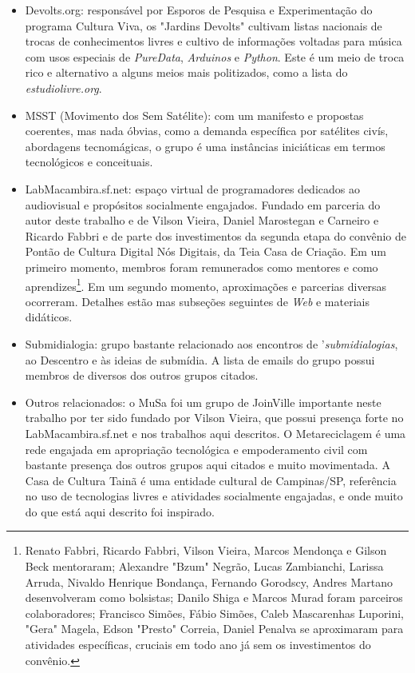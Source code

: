 \begin{itemize}
    \item Devolts.org: responsável por Esporos de Pesquisa e Experimentação do programa Cultura Viva, os "Jardins Devolts" cultivam listas nacionais de trocas de conhecimentos livres e cultivo de informações voltadas para música com usos especiais de \emph{PureData}, \emph{Arduinos} e \emph{Python}. Este é um meio de troca rico e alternativo a alguns meios mais politizados, como a lista do \emph{estudiolivre.org}.
    \item MSST (Movimento dos Sem Satélite): com um manifesto e propostas coerentes, mas nada óbvias, como a demanda específica por satélites civís, abordagens tecnomágicas, o grupo é uma instâncias iniciáticas em termos tecnológicos e conceituais.
    \item LabMacambira.sf.net: espaço virtual de programadores dedicados ao audiovisual e propósitos socialmente engajados. Fundado em parceria do autor deste trabalho e de Vilson Vieira, Daniel Marostegan e Carneiro e Ricardo Fabbri e de parte dos investimentos da segunda etapa do convênio de Pontão de Cultura Digital Nós Digitais, da Teia Casa de Criação. Em um primeiro momento, membros foram remunerados como mentores e como aprendizes\footnote{Renato Fabbri, Ricardo Fabbri, Vilson Vieira, Marcos Mendonça e Gilson Beck mentoraram; Alexandre "Bzum" Negrão, Lucas Zambianchi, Larissa Arruda, Nivaldo Henrique Bondança, Fernando Gorodscy, Andres Martano desenvolveram como bolsistas; Danilo Shiga e Marcos Murad foram parceiros colaboradores; Francisco Simões, Fábio Simões, Caleb Mascarenhas Luporini, "Gera" Magela, Edson "Presto" Correia, Daniel Penalva se aproximaram para atividades específicas, cruciais em todo ano já sem os investimentos do convênio.}. Em um segundo momento, aproximações e parcerias diversas ocorreram. Detalhes estão mas subseções seguintes de \emph{Web} e materiais didáticos.
    \item Submidialogia: grupo bastante relacionado aos encontros de '\emph{submidialogias}, ao Descentro e às ideias de submídia. A lista de emails do grupo possui membros de diversos dos outros grupos citados.
    \item Outros relacionados: o MuSa foi um grupo de JoinVille importante neste trabalho por ter sido fundado por Vilson Vieira, que possui presença forte no LabMacambira.sf.net e nos trabalhos aqui descritos. O  Metareciclagem é uma rede engajada em apropriação tecnológica e empoderamento civil com bastante presença dos outros grupos aqui citados e muito movimentada. A Casa de Cultura Tainã é uma entidade cultural de Campinas/SP, referência no uso de tecnologias livres e atividades socialmente engajadas, e onde muito do que está aqui descrito foi inspirado.
\end{itemize}


